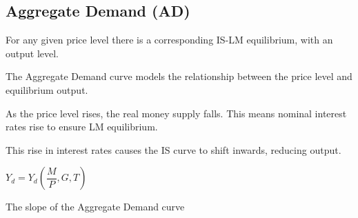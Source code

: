 
\subsection{Aggregate Demand (AD)}

For any given price level there is a corresponding IS-LM equilibrium, with an output level.

The Aggregate Demand curve models the relationship between the price level and equilibrium output.

As the price level rises, the real money supply falls. This means nominal interest rates rise to ensure LM equilibrium.

This rise in interest rates causes the IS curve to shift inwards, reducing output.

\(Y_d=Y_d(\dfrac{M}{P},G,T)\)

The slope of the Aggregate Demand curve



